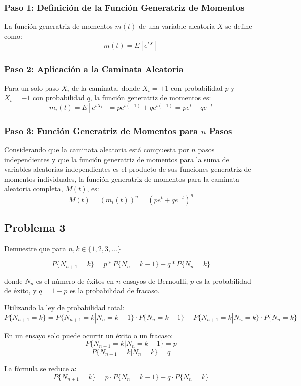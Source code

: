 \documentclass{article}
\begin{document}
\subsubsection*{Paso 1: Definición de la Función Generatriz de Momentos}
La función generatriz de momentos $m(t)$ de una variable aleatoria $X$ se define como:
\[ m(t) = E[e^{tX}] \]

\subsubsection*{Paso 2: Aplicación a la Caminata Aleatoria}
Para un solo paso $X_i$ de la caminata, donde $X_i = +1$ con probabilidad $p$ y $X_i = -1$ con probabilidad $q$, la función generatriz de momentos es:
\[ m_i(t) = E[e^{tX_i}] = pe^{t(+1)} + qe^{t(-1)} = pe^t + qe^{-t} \]

\subsubsection*{Paso 3: Función Generatriz de Momentos para $n$ Pasos}
Considerando que la caminata aleatoria está compuesta por $n$ pasos independientes y que la función generatriz de momentos para la suma de variables aleatorias independientes es el producto de sus funciones generatriz de momentos individuales, la función generatriz de momentos para la caminata aleatoria completa, $M(t)$, es:
\[ M(t) = (m_i(t))^n = (pe^t + qe^{-t})^n \]


\subsection*{Problema 3}

Demuestre que para $n,k \in \{1,2,3,\dots\}$

\[P\{N_{n+1} = k\} = p * P\{N_n = k-1\} + q * P\{N_n = k\}\]

donde $N_n$ es el número de éxitos en $n$ ensayos de Bernoulli, $p$ es la probabilidad de éxito, y $q = 1 - p$ es la probabilidad de fracaso.

Utilizando la ley de probabilidad total:
\[ P\{N_{n+1} = k\} = P\{N_{n+1} = k | N_n = k-1\} \cdot P\{N_n = k-1\} + P\{N_{n+1} = k | N_n = k\} \cdot P\{N_n = k\} \]

En un ensayo solo puede ocurrir un éxito o un fracaso:
\[ P\{N_{n+1} = k | N_n = k-1\} = p \]
\[ P\{N_{n+1} = k | N_n = k\} = q \]

La fórmula se reduce a:
\[ P\{N_{n+1} = k\} = p \cdot P\{N_n = k-1\} + q \cdot P\{N_n = k\} \]
\end{document}
